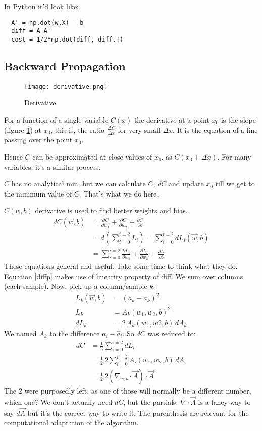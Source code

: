In Python it'd look like:
\begin{center}
  \begin{BVerbatim}
  A' = np.dot(w,X) - b
  diff = A-A' 
  cost = 1/2*np.dot(diff, diff.T)
  \end{BVerbatim}
\end{center}





\subsection{Backward Propagation}
\begin{figure}
  \centering
  \texttt{[image: derivative.png]}
  \caption{Derivative}\label{fig:basics}
\end{figure}

For a function of a single variable $C(x)$ the derivative at a point $x_0$ is the slope (figure \ref{fig:basics}) at $x_0$, this is, the ratio $\frac{\Delta C}{\Delta x}$ for very small $\Delta x$. It is the equation of a line passing over the point $x_0$. 

Hence $C$ can be approximated at close values of $x_0$, as $C(x_0 + \Delta x)$. For many variables, it's a similar process.

$C$ has no analytical min, but we can calculate $C$, $dC$ and update $x_0$ till we get to the minimum value of $C$. That's what we do here.

$C(w,b)$ derivative is used to find better weights and bias.
\begin{align}
  dC(\vec{w},b) &= \frac{\partial C}{\partial w_1}+ \frac{\partial C}{\partial w_2} + \frac{\partial C}{\partial b}\\
  &= d(\sum_{i=0}^{i=2}L_i) = \sum_{i=0}^{i=2}dL_i(\vec{w},b) \label{diffp}\\
  &=\sum_{i=0}^{i=2} \frac{\partial L_i}{\partial w_1} +\frac{\partial L_i}{\partial w_2} + \frac{\partial L}{\partial b}
\end{align} 
These equations general and useful. Take some time to think what they do. Equation \ref{diffp} makes use of linearity property of diff. We sum over columns (each sample). Now, pick up a column/sample $k$:
\begin{align*}
  L_k(\vec{w},b) &= (a_k - \hat{a}_k)^2\\
    L_k &= A_k(w_1, w_2, b)^2\\
    dL_k &= 2\,A_k(w1,w2,b)\,dA_k
\end{align*}
We named $A_k$ to the difference $a_i-\hat{a}_i$.
So $dC$ was reduced to:
\begin{align*}
  dC &= \frac{1}{2}\sum_{i=0}^{i=2} dL_i\\
  &= \frac{1}{2}\,{}2\sum_{i=0}^{i=2}A_i(w_1, w_2, b)\,dA_i\\
  &= \frac{1}{2}\,{}2(\nabla_{w,b}\cdot\vec{A})\cdot{}\vec{A}
\end{align*}
The $2$ were purposedly left, as one of those will normally be a different number, which one? We don't actually need $dC$, but the partials.
$\nabla\cdot\vec{A}$ is a fancy way to say $d\vec{A}$ but it's the correct way to write it. The parenthesis are relevant for the computational adaptation of the algorithm.

